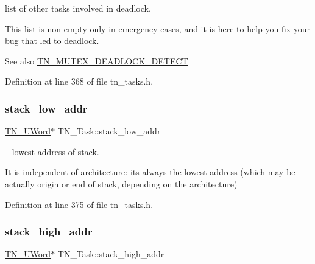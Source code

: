 list of other tasks involved in deadlock. 

This list is non-\/empty only in emergency cases, and it is here to help you fix your bug that led to deadlock.

\begin{DoxySeeAlso}{See also}
{\ttfamily \hyperlink{tn__cfg__default_8h_a6ed3ec7b0d4338e7f60dde86b7ea5fa4}{T\+N\+\_\+\+M\+U\+T\+E\+X\+\_\+\+D\+E\+A\+D\+L\+O\+C\+K\+\_\+\+D\+E\+T\+E\+CT}} 
\end{DoxySeeAlso}


Definition at line 368 of file tn\+\_\+tasks.\+h.

\mbox{\label{structTN__Task_a05cfde00b0cd82cda88a6698dc159e31}} 
\subsubsection{\texorpdfstring{stack\+\_\+low\+\_\+addr}{stack\_low\_addr}}
{\footnotesize\ttfamily \hyperlink{tn__arch__example_8h_ab80cba0fe9ffcd9011d53dfeb9e39bf4}{T\+N\+\_\+\+U\+Word}$\ast$ T\+N\+\_\+\+Task\+::stack\+\_\+low\+\_\+addr}



-- lowest address of stack. 

It is independent of architecture\+: it\textquotesingle{}s always the lowest address (which may be actually origin or end of stack, depending on the architecture) 

Definition at line 375 of file tn\+\_\+tasks.\+h.

\mbox{\label{structTN__Task_a4497d6972b9a7706608708847d29aa46}} 
\subsubsection{\texorpdfstring{stack\+\_\+high\+\_\+addr}{stack\_high\_addr}}
{\footnotesize\ttfamily \hyperlink{tn__arch__example_8h_ab80cba0fe9ffcd9011d53dfeb9e39bf4}{T\+N\+\_\+\+U\+Word}$\ast$ T\+N\+\_\+\+Task\+::stack\+\_\+high\+\_\+addr}



